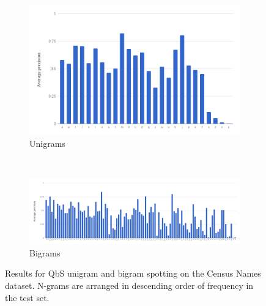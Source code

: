 \documentclass[ms,electronic,twosidetoc,letterpaper,chaptercenter,parttop,lof,lot]{byumsphd}
\begin{document}
\begin{figure}
\centering
\begin{subfigure}{.99\textwidth}
  \centering
  \includegraphics[width=.75\linewidth]{namesUniSpot}
  \caption{Unigrams}
  \label{fig:namesUniSpot}
\end{subfigure}
\\
\begin{subfigure}{.99\textwidth}
  \centering
  \includegraphics[width=.99\linewidth]{namesBiSpot}
  \caption{Bigrams}
  \label{fig:namesBiSpot}
\end{subfigure}
\caption{Results for QbS unigram and bigram spotting on the Census Names dataset. N-grams are arranged in descending order of frequency in the test set.}
\label{fig:namessub}
\end{figure}
\end{document}
